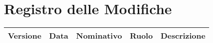 \section*{\Large Registro delle Modifiche}
    \begin{table}[H]
        \centering
        \renewcommand\tabularxcolumn[1]{m{#1}} %
        \renewcommand{\arraystretch}{1.5}
        \begin{tabularx}{0.98\textwidth}
            {c|c|c|c|>{\centering\arraybackslash}X}
            \rowcolor{black}
            \textbf{\color{white} Versione} & \textbf{\color{white} Data} & \textbf{\color{white} Nominativo} & \textbf{\color{white} Ruolo} & \textbf{\color{white} Descrizione} \\ 
            \hline


\end{tabularx}
\end{table}
